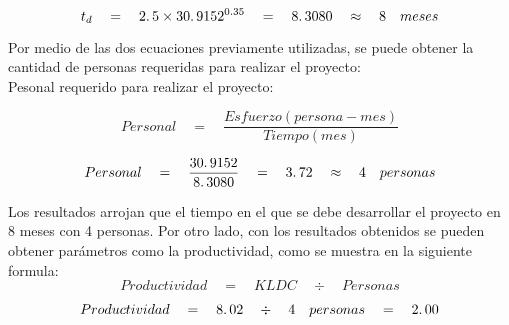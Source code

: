 \begin{equation}
	t_d \quad = \quad 2\ldotp5 \times 30\ldotp9152^{0\ldotp35}  \quad = \quad 8\ldotp3080 \quad\approx \quad 8 \quad meses
\end{equation}

Por medio de las dos ecuaciones previamente utilizadas, se puede obtener la cantidad de personas requeridas para realizar el proyecto: \\

Pesonal requerido para realizar el proyecto: 

\begin{equation}
	Personal \quad = \quad \frac{Esfuerzo(persona-mes)}{Tiempo(mes)}
\end{equation}

\begin{equation}
	Personal \quad = \quad \frac{30\ldotp9152}{8\ldotp3080} \quad = \quad 3\ldotp72 \quad \approx \quad 4 \quad personas
\end{equation}

Los resultados arrojan que el tiempo en el que se debe desarrollar el proyecto en 8 meses con 4 personas. Por otro lado, con los resultados obtenidos se pueden obtener parámetros como la productividad, como se muestra en la siguiente formula: \\

\begin{equation}
	Productividad \quad = \quad KLDC \quad \div \quad Personas
\end{equation}

\begin{equation}
	Productividad \quad = \quad 8\ldotp02 \quad \div \quad 4 \quad personas \quad = \quad 2\ldotp00
\end{equation}